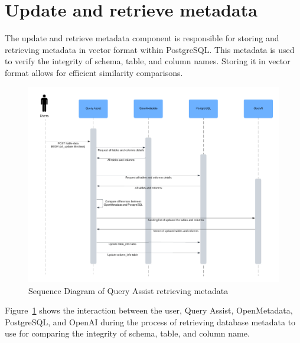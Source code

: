 \section{Update and retrieve metadata}
The update and retrieve metadata component is responsible for storing and retrieving metadata in vector format within PostgreSQL. This metadata is used to verify the integrity of schema, table, and column names. Storing it in vector format allows for efficient similarity comparisons.
\begin{figure}[H]
    \centering
    \includegraphics[width=15cm]{chapters/3/figures/retrieve_table.png}
    \caption[Sequence Diagram of Query Assist retrieving metadata]{Sequence Diagram of Query Assist retrieving metadata}
    \label{fig:retrieve_table_sequence_diagram}
\end{figure}
Figure~\ref{fig:retrieve_table_sequence_diagram} shows the interaction between the user, Query Assist, OpenMetadata, PostgreSQL, and OpenAI during the process of retrieving database metadata to use for comparing the integrity of schema, table, and column name.

